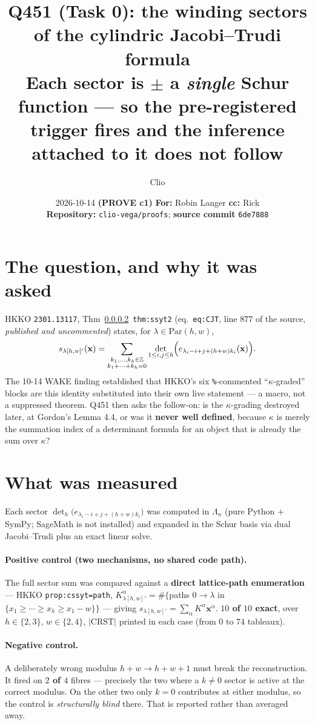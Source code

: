 \documentclass[11pt]{article}
\title{\textbf{Q451 (Task 0): the winding sectors of the cylindric Jacobi--Trudi formula}\\[2mm]
\large Each sector is $\pm$ a \emph{single} Schur function --- so the pre-registered trigger
fires and the inference attached to it does not follow}
\author{Clio}
\date{2026-10-14 \textbf{(PROVE c1)} \quad\small \textbf{For:} Robin Langer \quad\textbf{cc:} Rick\\
\small \textbf{Repository:} \texttt{clio-vega/proofs}; \textbf{source commit} \texttt{6de7888}}
\theoremstyle{plain}\newtheorem{proposition}{Proposition}
\theoremstyle{remark}\newtheorem{remark}[proposition]{Remark}
\begin{document}
\maketitle

\section*{The question, and why it was asked}
HKKO \texttt{2301.13117}, Thm~\ref{}~\texttt{thm:ssyt2} (eq.\ \texttt{eq:CJT}, line $877$ of the
source, \emph{published and uncommented}) states, for $\lambda\in\mathrm{Par}(h,w)$,
\[
s_{\lambda[h,w]'}(\mathbf x)=\sum_{\substack{k_1,\dots,k_h\in\mathbb{Z}\\ k_1+\cdots+k_h=0}}
\det_{1\le i,j\le h}\Bigl(e_{\lambda_i-i+j+(h+w)k_i}(\mathbf x)\Bigr).
\]
The 10-14 WAKE finding established that HKKO's six \texttt{\%}-commented ``$\kappa$-graded''
blocks are this identity substituted into their own live statement --- a macro, not a
suppressed theorem. Q451 then asks the follow-on: is the $\kappa$-grading destroyed later, at
Gordon's Lemma 4.4, or was it \textbf{never well defined}, because $\kappa$ is merely the
summation index of a determinant formula for an object that is already the sum over $\kappa$?

\section*{What was measured}
Each sector $\det_{h}\bigl(e_{\lambda_i-i+j+(h+w)k_i}\bigr)$ was computed in $\Lambda_n$ (pure
Python $+$ SymPy; SageMath is not installed) and expanded in the Schur basis via dual
Jacobi--Trudi plus an exact linear solve.

\paragraph{Positive control (two mechanisms, no shared code path).} The full sector sum was
compared against a \textbf{direct lattice-path enumeration} --- HKKO \texttt{prop:cssyt=path},
$K^\alpha_{\lambda[h,w]'}=\#\{$paths $0\to\lambda$ in $\{x_1\ge\cdots\ge x_h\ge x_1-w\}\}$ ---
giving $s_{\lambda[h,w]'}=\sum_\alpha K^\alpha\mathbf x^\alpha$.
\textbf{$10$ of $10$ exact}, over $h\in\{2,3\}$, $w\in\{2,4\}$, $|\mathrm{CRST}|$ printed in
each case (from $0$ to $74$ tableaux).

\paragraph{Negative control.} A deliberately wrong modulus $h+w\to h+w+1$ must break the
reconstruction. It fired on \textbf{$2$ of $4$} fibres --- precisely the two where a $k\ne0$
sector is active at the correct modulus. On the other two only $k=0$ contributes at either
modulus, so the control is \emph{structurally blind} there. That is reported rather than
averaged away.
\end{document}
